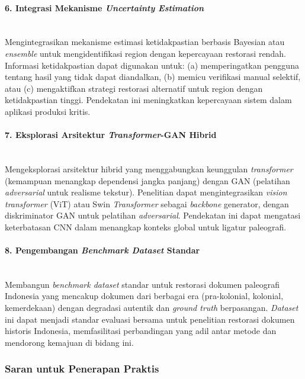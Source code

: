 \documentclass[12pt,a4paper]{article}
\begin{document}
\paragraph{6. Integrasi Mekanisme \textit{Uncertainty Estimation}} \mbox{}\\[0.1em]
Mengintegrasikan mekanisme estimasi ketidakpastian berbasis Bayesian atau \textit{ensemble} untuk mengidentifikasi region dengan kepercayaan restorasi rendah. Informasi ketidakpastian dapat digunakan untuk: (a) memperingatkan pengguna tentang hasil yang tidak dapat diandalkan, (b) memicu verifikasi manual selektif, atau (c) mengaktifkan strategi restorasi alternatif untuk region dengan ketidakpastian tinggi. Pendekatan ini meningkatkan kepercayaan sistem dalam aplikasi produksi kritis.

\paragraph{7. Eksplorasi Arsitektur \textit{Transformer}-GAN Hibrid} \mbox{}\\[0.1em]
Mengeksplorasi arsitektur hibrid yang menggabungkan keunggulan \textit{transformer} (kemampuan menangkap dependensi jangka panjang) dengan GAN (pelatihan \textit{adversarial} untuk realisme tekstur). Penelitian dapat mengintegrasikan \textit{vision transformer} (ViT) atau Swin \textit{Transformer} sebagai \textit{backbone} generator, dengan diskriminator GAN untuk pelatihan \textit{adversarial}. Pendekatan ini dapat mengatasi keterbatasan CNN dalam menangkap konteks global untuk ligatur paleografi.

\paragraph{8. Pengembangan \textit{Benchmark Dataset} Standar} \mbox{}\\[0.1em]
Membangun \textit{benchmark dataset} standar untuk restorasi dokumen paleografi Indonesia yang mencakup dokumen dari berbagai era (pra-kolonial, kolonial, kemerdekaan) dengan degradasi autentik dan \textit{ground truth} berpasangan. \textit{Dataset} ini dapat menjadi standar evaluasi bersama untuk penelitian restorasi dokumen historis Indonesia, memfasilitasi perbandingan yang adil antar metode dan mendorong kemajuan di bidang ini.

\vspace{0.8em}

\subsubsection{Saran untuk Penerapan Praktis}
\label{subsubsec:saran-praktis}
\end{document}
